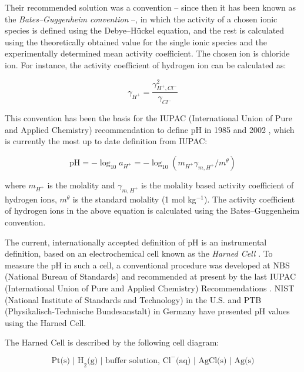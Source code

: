 \documentclass[manuscript=article, journal=jceda8]{achemso}
\begin{document}
Their recommended solution was a convention -- since then it has been known as the \emph{Bates--Guggenheim convention} --, in which the activity of a chosen ionic species is defined using the Debye--Hückel equation, and the rest is calculated using the theoretically obtained value for the single ionic species and the experimentally determined mean activity coefficient. The chosen ion is chloride ion. For instance, the activity coefficient of hydrogen ion can be calculated as:

\begin{equation}
\gamma_{H^+} = \frac{\gamma_{H^+, Cl^-}^2}{\gamma_{Cl^-}}
\end{equation}

This convention has been the basis for the IUPAC (International Union of Pure and Applied Chemistry) recommendation to define pH in 1985 \cite{covington1985definition} and 2002 \cite{buck2002measurement}, which is currently the most up to date definition from IUPAC:

\begin{equation}
\textrm{pH}= -\log_{10}a_{H^+} = -\log_{10}(m_{H^+} \gamma_{m, H^+}/m^\theta)
\end{equation}

where $m_{H^+}$ is the molality and $\gamma_{m, H^+}$ is the molality based activity coefficient of hydrogen ions, $m^\theta$ is the standard molality (1 mol kg$^{-1}$). The activity coefficient of hydrogen ions in the above equation is calculated using the Bates--Guggenheim convention.




The current, internationally accepted definition of pH is an instrumental definition, based on an electrochemical cell known as the \emph{Harned Cell} \cite{harned1958activity}.
To measure the pH in such a cell, a conventional procedure was developed at NBS (National Bureau of Standards) \cite{durst1975standardization} and recommended at present by the last IUPAC (International Union of Pure and Applied Chemistry) Recommendations \cite{covington2002measurement}.
NIST (National Institute of Standards and Technology) in the U.S. and PTB (Physikalisch-Technische Bundesanstalt) in Germany have presented pH values using the Harned Cell. 

The Harned Cell is described by the following cell diagram: 

\begin{equation}
\textrm{Pt(s) | H}_2\textrm{(g) | buffer solution, Cl}^-\textrm{(aq) | AgCl(s) | Ag(s)}
\label{eq:harned}
\end{equation}
\end{document}
